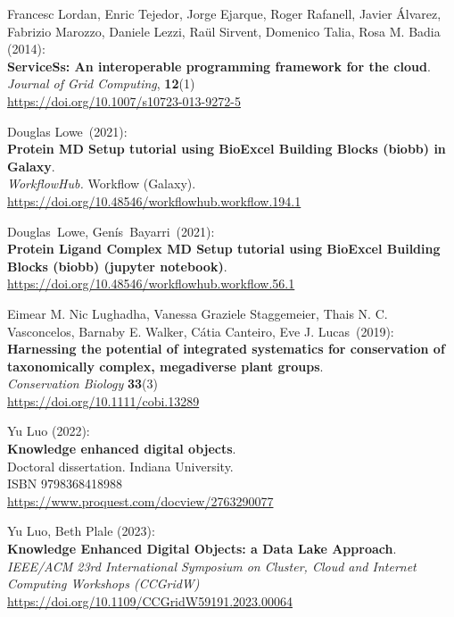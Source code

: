 \begin{thebibliography}{9}
Francesc Lordan, Enric Tejedor, Jorge Ejarque, Roger
Rafanell, Javier Álvarez, Fabrizio Marozzo, Daniele Lezzi, Raül Sirvent,
Domenico Talia, Rosa M. Badia (2014):\\
\textbf{ServiceSs: An interoperable programming framework for the
cloud}.\\
\emph{Journal of Grid Computing}, \textbf{12}(1)\\
\url{https://doi.org/10.1007/s10723-013-9272-5}

Douglas Lowe~(2021):\\
\textbf{Protein MD Setup tutorial using BioExcel Building Blocks (biobb)
in Galaxy}.\\
\emph{WorkflowHub.} Workflow (Galaxy).\\
\url{https://doi.org/10.48546/workflowhub.workflow.194.1}

Douglas~Lowe, Genís~Bayarri~(2021):\\
\textbf{Protein Ligand Complex MD Setup tutorial using BioExcel Building
Blocks (biobb) (jupyter notebook)}.\\
\url{https://doi.org/10.48546/workflowhub.workflow.56.1}

Eimear M. Nic Lughadha, Vanessa Graziele Staggemeier, Thais N. C. Vasconcelos, Barnaby E. Walker, Cátia Canteiro, Eve J. Lucas~(2019):\\
\textbf{Harnessing the potential of integrated systematics for conservation of taxonomically complex, megadiverse plant groups}.\\ 
\emph{Conservation Biology} \textbf{33}(3)\\
\url{https://doi.org/10.1111/cobi.13289}

Yu Luo (2022):\\
\textbf{Knowledge enhanced digital objects}.\\
Doctoral dissertation. Indiana University.\\
ISBN 9798368418988 \\
\url{https://www.proquest.com/docview/2763290077}

Yu Luo, Beth Plale (2023):\\
\textbf{Knowledge Enhanced Digital Objects: a Data Lake Approach}.\\
\emph{IEEE/ACM 23rd International Symposium on Cluster, Cloud and Internet Computing Workshops (CCGridW)}\\
\url{https://doi.org/10.1109/CCGridW59191.2023.00064}


\end{thebibliography}
